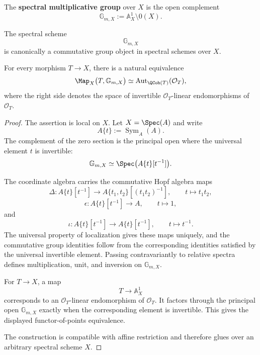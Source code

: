 \begin{definition}
\label{def:spectral-multiplicative-group}
The \textbf{spectral multiplicative group} over $X$ is the open complement
\[
    \mathbb G_{m,X}
    :=
    \mathbb A_X^1
    \setminus
    0(X).
\]
\end{definition}

\begin{proposition}
\label{prop:spectral-multiplicative-group-structure}
The spectral scheme
\[
    \mathbb G_{m,X}
\]
is canonically a commutative group object in spectral schemes over $X$.

For every morphism $T\to X$, there is a natural equivalence
\[
    \Map_X
    \bigl(
        T,
        \mathbb G_{m,X}
    \bigr)
    \simeq
    \operatorname{Aut}_{\QCoh(T)}
    (\mathcal O_T),
\]
where the right side denotes the space of invertible
$\mathcal O_T$-linear endomorphisms of $\mathcal O_T$.
\end{proposition}

\begin{proof}
The assertion is local on $X$. Let $X=\Spec(A)$ and write
\[
    A\{t\}
    :=
    \operatorname{Sym}_A(A).
\]
The complement of the zero section is the principal open where the
universal element $t$ is invertible:
\[
    \mathbb G_{m,X}
    \simeq
    \Spec
    \bigl(
        A\{t\}[t^{-1}]
    \bigr).
\]

The coordinate algebra carries the commutative Hopf algebra maps
\[
    \Delta
    \colon
    A\{t\}[t^{-1}]
    \longrightarrow
    A\{t_1,t_2\}
    [(t_1t_2)^{-1}],
    \qquad
    t\longmapsto t_1t_2,
\]
\[
    \epsilon
    \colon
    A\{t\}[t^{-1}]
    \longrightarrow
    A,
    \qquad
    t\longmapsto1,
\]
and
\[
    \iota
    \colon
    A\{t\}[t^{-1}]
    \longrightarrow
    A\{t\}[t^{-1}],
    \qquad
    t\longmapsto t^{-1}.
\]
The universal property of localization gives these maps uniquely, and
the commutative group identities follow from the corresponding identities
satisfied by the universal invertible element. Passing contravariantly to
relative spectra defines multiplication, unit, and inversion on
$\mathbb G_{m,X}$.

For $T\to X$, a map
\[
    T
    \longrightarrow
    \mathbb A_X^1
\]
corresponds to an $\mathcal O_T$-linear endomorphism of $\mathcal O_T$.
It factors through the principal open $\mathbb G_{m,X}$ exactly when the
corresponding element is invertible. This gives the displayed
functor-of-points equivalence.

The construction is compatible with affine restriction and therefore
glues over an arbitrary spectral scheme $X$.
\end{proof}

